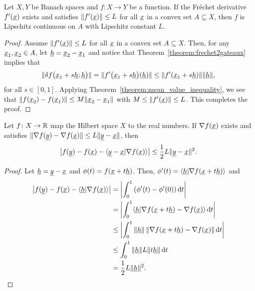 \begin{lemma}
Let $X,Y$ be Banach spaces and $f \colon X \rightarrow Y$ be a function.
If the Fr\'{e}chet derivative $f'(\underline{x})$ exists and satisfies $\| f'(\underline{x})\| \leq L$ for all $\underline{x}$ in a convex set $A\subseteq X$, then $f$ is Lipschitz continuous on $A$ with Lipschitz constant $L$.
\end{lemma}

\begin{proof}
Assume $\| f'(\underline{x})\| \leq L$ for all $\underline{x}$ in a convex set $A\subseteq X$.
Then, for any $\underline{x}_1 , \underline{x}_2 \in A$, let $\underline{h} = \underline{x}_2 - \underline{x}_1$ and notice that Theorem~\ref{theorem:frechet2gateaux} implies that
\[ \| \delta f \big( \underline{x}_1+s\underline{h}; \underline{h}\big) \|  = \| f'\big( \underline{x}_1+s\underline{h} \big)(\underline{h}) \| \leq \| f'(\underline{x}_1 + s \underline{h})\| \|\underline{h} \|, \] 
for all $s\in [0,1]$.
Applying Theorem~\ref{theorem:mean_value_inequality}, we see that $\|f(\underline{x}_2)-f(\underline{x}_1)\| \leq M \| \underline{x}_2 - \underline{x}_1\|$ with $M \leq \| f'(\underline{x})\| \leq L$.
This completes the proof.
\end{proof}

\begin{lemma}
Let $f \colon X \rightarrow \mathbb{R}$ map the Hilbert space $X$ to the real numbers.
If $\nabla f(\underline{x})$ exists and satisfies $ \| \nabla f(\underline{y}) - \nabla f(\underline{x}) \| \leq L \| \underline{y} - \underline{x} \|$, then
\[ \big| f(\underline{y}) - f(\underline{x}) - \langle\underline{y}-\underline{x} | \nabla f (\underline{x}) \rangle \big| \leq \frac{1}{2} L \| \underline{y}-\underline{x} \|^2. \]
\end{lemma}

\begin{proof}
Let $\underline{h} = \underline{y}-\underline{x}$ and $\phi(t) = f(\underline{x} + t \underline{h})$. Then, $\phi'(t) = \langle \underline{h} | \nabla f(\underline{x} + t \underline{h}) \rangle$ and 
\begin{align*}
\big| f(\underline{y}) -  f(\underline{x}) - \langle \underline{h} | \nabla f(\underline{x}) \rangle \big| &= \left| \int_{0}^1 \left( \phi'(t) - \phi'(0) \right) \mathrm{d}t \right| \\
&=  \left| \int_{0}^1 \langle \underline{h} | \nabla f(\underline{x} + t \underline{h}) - \nabla f(\underline{x}) \rangle \, \mathrm{d}t \right| \\
&\leq \left| \int_{0}^1  \| \underline{h} \| \, \| \nabla f(\underline{x} + t \underline{h}) - \nabla f(\underline{x}) \| \, \mathrm{d}t \right| \\
&\leq \int_{0}^1 \|\underline{h} \| L \| t \underline{h} \| \, \mathrm{d}t \\
&= \frac{1}{2} L \| \underline{h} \|^2. \qedhere
\end{align*}
\end{proof}

